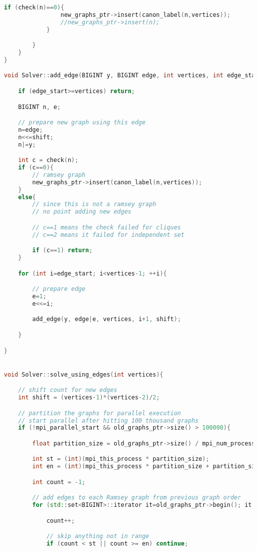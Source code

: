 \documentclass[12pt]{etsu_thesis}
\begin{document}
\begin{lstlisting}[language=C++]
            if (check(n)==0){
                new_graphs_ptr->insert(canon_label(n,vertices));
                //new_graphs_ptr->insert(n);
            }

        }
    }
}

void Solver::add_edge(BIGINT y, BIGINT edge, int vertices, int edge_start, int shift){

    if (edge_start>=vertices) return;

    BIGINT n, e;

    // prepare new graph using this edge
    n=edge;
    n<<=shift;
    n|=y;

    int c = check(n);
    if (c==0){
        // ramsey graph
        new_graphs_ptr->insert(canon_label(n,vertices));
    }
    else{
        // since this is not a ramsey graph
        // no point adding new edges

        // c==1 means the check failed for cliques
        // c==2 means it failed for independent set

        if (c==1) return;
    }

    for (int i=edge_start; i<vertices-1; ++i){

        // prepare edge
        e=1;
        e<<=i;

        add_edge(y, edge|e, vertices, i+1, shift);

    }

}


void Solver::solve_using_edges(int vertices){

    // shift count for new edges
    int shift = (vertices-1)*(vertices-2)/2;

    // partition the graphs for parallel execution
    // start parallel after hitting 100 thousand graphs
    if (!mpi_parallel_start && old_graphs_ptr->size() > 100000){

        float partition_size = old_graphs_ptr->size() / mpi_num_processes;

        int st = (int)(mpi_this_process * partition_size);
        int en = (int)(mpi_this_process * partition_size + partition_size);

        int count = -1;

        // add edges to each Ramsey graph from previous graph order
        for (std::set<BIGINT>::iterator it=old_graphs_ptr->begin(); it != old_graphs_ptr->end(); ++it){

            count++;

            // skip anything not in range
            if (count < st || count >= en) continue;


\end{lstlisting}
\end{document}
